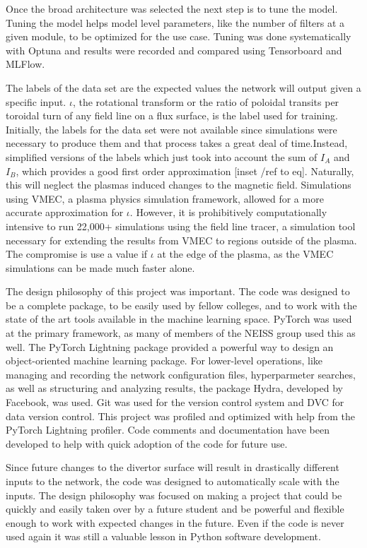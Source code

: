 \label{sec:code:hyperparameters}

Once the broad architecture was selected the next step is to tune the model. Tuning the model helps model level parameters, like the number of filters at a given module, to be optimized for the use case. Tuning was done systematically with Optuna and results were recorded and compared using Tensorboard and MLFlow.

The labels of the data set are the expected values the network will output given a specific input. $\iota$, the rotational transform or the ratio of poloidal transits per toroidal turn of any field line on a flux surface, is the label used for training. Initially, the labels for the data set were not available since simulations were necessary to produce them and that process takes a great deal of time.Instead, simplified versions of the labels which just took into account the sum of $I_A$ and $I_B$, which provides a good first order approximation [inset /ref{} to eq]. Naturally, this will neglect the plasmas induced changes to the magnetic field. Simulations using VMEC, a plasma physics simulation framework, allowed for a more accurate approximation for $\iota$. However, it is prohibitively computationally intensive to run 22,000+ simulations using the field line tracer, a simulation tool necessary for extending the results from VMEC to regions outside of the plasma. The compromise is use a value if $\iota$ at the edge of the plasma, as the VMEC simulations can be made much faster alone.

\label{sec:code:philosophy}
The design philosophy of this project was important. The code was designed to be a complete package, to be easily used by fellow colleges, and to work with the state of the art tools available in the machine learning space. PyTorch was used at the primary framework, as many of members of the NEISS group used this as well. The PyTorch Lightning package provided a powerful way to design an object-oriented machine learning package. For lower-level operations, like managing and recording the network configuration files, hyperparmeter searches, as well as structuring and analyzing results, the package Hydra, developed by Facebook, was used. Git was used for the version control system and DVC for data version control. This project was profiled and optimized with help from the PyTorch Lightning profiler. Code comments and documentation have been developed to help with quick adoption of the code for future use.

Since future changes to the divertor surface will result in drastically different inputs to the network, the code was designed to automatically scale with the inputs. The design philosophy was focused on making a project that could be quickly and easily taken over by a future student and be powerful and flexible enough to work with expected changes in the future. Even if the code is never used again it was still a valuable lesson in Python software development.